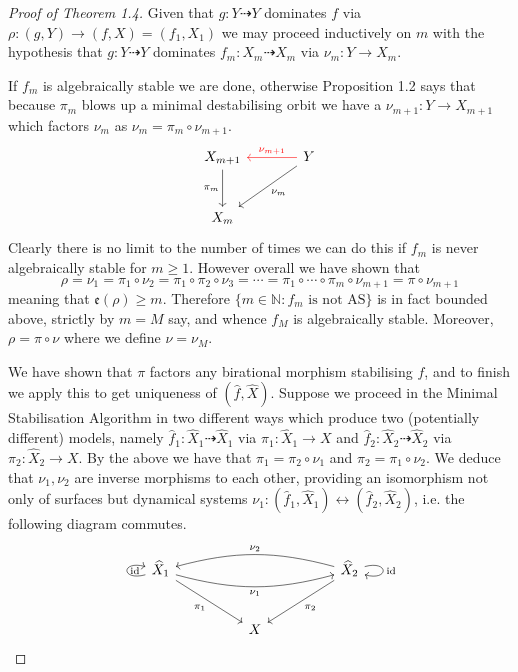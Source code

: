 \documentclass[11pt]{article}
\newcommand{\rat}{\dashrightarrow}
\newcommand{\exc}{\mathfrak{e}}
\begin{document}
\begin{proof}[Proof of Theorem 1.4]
Given that $g:Y\rat Y$ dominates $f$ via
$\rho:(g,Y)\to(f,X)=(f_1,X_1)$ we may proceed inductively on $m$ with the
hypothesis that $g:Y\rat Y$ dominates $f_m:X_m\rat X_m$ via
$\nu_m:Y\to X_m$.

If $f_m$ is algebraically stable we are done, otherwise Proposition 1.2
says that because $\pi_m$ blows up a minimal destabilising orbit we have
a $\nu_{m+1}:Y\to X_{m+1}$ which factors $\nu_m$ as
$\nu_m=\pi_m\circ\nu_{m+1}$.
\[
\begin{tikzcd}[row sep=large,column sep=large]
X_{m+1} \arrow[d,"\pi_m"'] & Y \arrow[l,red,"\nu_{m+1}"'] \arrow[dl,"\nu_m"] \\
X_m & {}
\end{tikzcd}
\]
Clearly there is no limit to the number of times we can do this if $f_m$
is never algebraically stable for $m\geq1$. However overall we have shown
that
\[
\rho=\nu_1=\pi_1\circ\nu_2=\pi_1\circ\pi_2\circ\nu_3
=\cdots=\pi_1\circ\cdots\circ\pi_m\circ\nu_{m+1}=\pi\circ\nu_{m+1}
\]
meaning that $\exc(\rho)\geq m$. Therefore
$\{m\in\mathbb N:f_m\text{ is not AS}\}$ is in fact bounded above,
strictly by $m=M$ say, and whence $f_M$ is algebraically stable. Moreover,
$\rho=\pi\circ\nu$ where we define $\nu=\nu_M$.

We have shown that $\pi$ factors any birational morphism stabilising $f$,
and to finish we apply this to get uniqueness of $(\widehat f,\widehat X)$.
Suppose we proceed in the Minimal Stabilisation Algorithm in two different
ways which produce two (potentially different) models, namely
$\widehat f_1:\widehat X_1\rat\widehat X_1$ via
$\pi_1:\widehat X_1\to X$ and
$\widehat f_2:\widehat X_2\rat\widehat X_2$ via
$\pi_2:\widehat X_2\to X$. By the above we have that
$\pi_1=\pi_2\circ\nu_1$ and $\pi_2=\pi_1\circ\nu_2$. We deduce that
$\nu_1,\nu_2$ are inverse morphisms to each other, providing an
isomorphism not only of surfaces but dynamical systems
$\nu_1:(\widehat f_1,\widehat X_1)\leftrightarrow
(\widehat f_2,\widehat X_2)$, i.e. the following diagram commutes.
\[
\begin{tikzcd}[row sep=large,column sep=huge]
\widehat X_1
 \arrow[rr,bend right=15,"\nu_1"']
 \arrow[dr,"\pi_1"']
 \arrow[loop left,"\mathrm{id}"']
 & {} & \widehat X_2
 \arrow[ll,bend right=15,"\nu_2"']
 \arrow[dl,"\pi_2"]
 \arrow[loop right,"\mathrm{id}"] \\
 & X & {}
\end{tikzcd}
\]
\end{proof}
\end{document}
